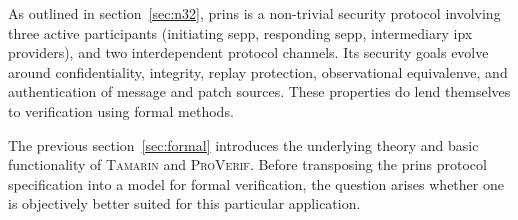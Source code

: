 As outlined in section~\ref{sec:n32}, \gls{prins} is a non-trivial security protocol involving three active participants (initiating \gls{sepp}, responding \gls{sepp}, intermediary \gls{ipx} providers), and two interdependent protocol channels.
Its security goals evolve around confidentiality, integrity, replay protection, observational equivalenve, and authentication of message and patch sources.
These properties do lend themselves to verification using formal methods.

The previous section~\ref{sec:formal} introduces the underlying theory and basic functionality of \textsc{Tamarin} and \textsc{ProVerif}.
Before transposing the \gls{prins} protocol specification into a model for formal verification, the question arises whether one is objectively better suited for this particular application.
\\

